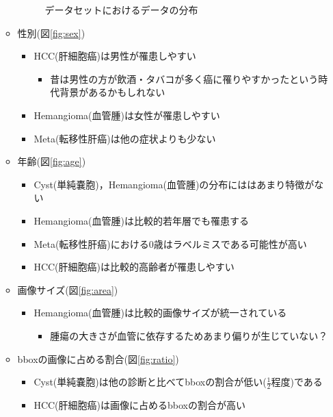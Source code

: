\documentclass[a4j]{ujarticle}
\newcommand{\Fref}[1]{\mbox{図\ref{fig:#1}}}
\begin{document}
\begin{itemize}
\begin{itemize}
\begin{figure}[h]
                    \caption{データセットにおけるデータの分布}
                \end{figure}
                \item 性別(\Fref{sex})
                \begin{itemize}
                    \item HCC(肝細胞癌)は男性が罹患しやすい
                    \begin{itemize}
                        \item 昔は男性の方が飲酒・タバコが多く癌に罹りやすかったという時代背景があるかもしれない
                    \end{itemize}
                    \item Hemangioma(血管腫)は女性が罹患しやすい
                    \item Meta(転移性肝癌)は他の症状よりも少ない
                \end{itemize}
                \item 年齢(\Fref{age})
                \begin{itemize}
                    \item Cyst(単純嚢胞)，Hemangioma(血管腫)の分布にははあまり特徴がない
                    \item Hemangioma(血管腫)は比較的若年層でも罹患する
                    \item Meta(転移性肝癌)における0歳はラベルミスである可能性が高い
                    \item HCC(肝細胞癌)は比較的高齢者が罹患しやすい
                \end{itemize}
                \item 画像サイズ(\Fref{area})
                \begin{itemize}
                    \item Hemangioma(血管腫)は比較的画像サイズが統一されている
                    \begin{itemize}
                        \item 腫瘍の大きさが血管に依存するためあまり偏りが生じていない？
                    \end{itemize}
                \end{itemize}
                \item bboxの画像に占める割合(\Fref{ratio})
                \begin{itemize}
                    \item Cyst(単純嚢胞)は他の診断と比べてbboxの割合が低い($\frac{1}{2}$程度)である
                    \item HCC(肝細胞癌)は画像に占めるbboxの割合が高い
                \end{itemize}
            \end{itemize}
        \end{itemize}
\end{document}
